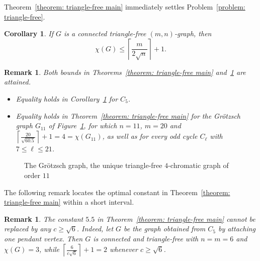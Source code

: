 \documentclass{amsart}
\theoremstyle{plain}
\newtheorem{corollary}[theorem]{Corollary}
\newtheorem{remark}[theorem]{Remark}
\begin{document}
Theorem~\ref{theorem: triangle-free main} immediately settles Problem~\ref{problem: triangle-free}.

\begin{corollary} \label{corollary: problem}
If $G$ is a connected triangle-free $(m,n)$-graph, then
$$\chi(G) \leq \left\lceil \frac{m}{2\sqrt{n}} \right\rceil + 1.
$$
\end{corollary}



\begin{remark} \label{remark: sharpness}
Both bounds in Theorems~\ref{theorem: triangle-free main} and~\ref{corollary: problem} are attained.
\begin{itemize}
  \item[(i)] Equality holds in Corollary~\ref{corollary: problem} for $C_5$.
  \item[(ii)] Equality holds in Theorem~\ref{theorem: triangle-free main} for the Gr\"{o}tzsch graph $G_{11}$ of Figure~\ref{figure: grotzsch}, for which $n = 11$, $m = 20$ and $\left\lceil \frac{20}{\sqrt{60.5}} \right\rceil + 1 = 4 = \chi(G_{11})$, as well as for every odd cycle $C_\ell$ with $7 \leq \ell \leq 21$.
\end{itemize}
\end{remark}

\begin{figure}[ht]
\centering
{}
\caption{The Gr\"{o}tzsch graph, the unique triangle-free $4$-chromatic graph of order $11$~\cite{chvatal1974minimality}}
\label{figure: grotzsch}
\end{figure}

The following remark locates the optimal constant in Theorem~\ref{theorem: triangle-free main} within a short interval.

\begin{remark} \label{remark: constant}
The constant $5.5$ in Theorem~\ref{theorem: triangle-free main} cannot be replaced by any $c \geq \sqrt{6}$. Indeed, let $G$ be the graph obtained from $C_5$ by attaching one pendant vertex. Then $G$ is connected and triangle-free with $n = m = 6$ and $\chi(G) = 3$, while $\left\lceil \frac{6}{c\sqrt{6}} \right\rceil + 1 = 2$ whenever $c \geq \sqrt{6}$.
\end{remark}




\bigskip




\end{document}
